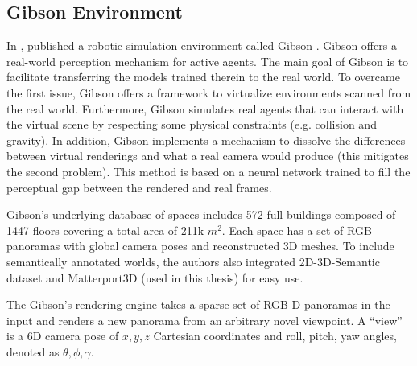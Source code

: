 \subsection{Gibson Environment}

In \citeyear{gibson}, \citeauthor{gibson} published a robotic simulation environment called Gibson \cite{gibson}. Gibson offers a real-world perception mechanism for active agents. 
The main goal of Gibson is to facilitate transferring the
models trained therein to the real world. To overcame the first issue, Gibson offers a framework to virtualize environments scanned from the real world. Furthermore, Gibson simulates real agents that can interact with the virtual scene by respecting some physical constraints (e.g. collision and gravity). In addition, Gibson implements a mechanism to dissolve the differences between virtual renderings and what a real camera would produce (this mitigates the second problem). This method is based on a neural network trained to fill the perceptual gap between the rendered and real frames.

Gibson’s underlying database of spaces includes 572 full buildings composed of 1447 floors covering a total area of 211k $m^{2}$. Each space has a set of RGB panoramas with global camera poses and reconstructed 3D meshes. To include semantically annotated worlds, the authors also integrated 2D-3D-Semantic dataset \cite{stanford2d3d} and Matterport3D \cite{matterport} (used in this thesis) for easy use.

The Gibson's rendering engine takes a sparse set of RGB-D panoramas in the input and renders a new panorama from an arbitrary novel viewpoint. A ``view'' is a 6D camera pose of $x, y, z$ Cartesian coordinates and roll, pitch, yaw angles, denoted as $\theta, \phi, \gamma$. 

